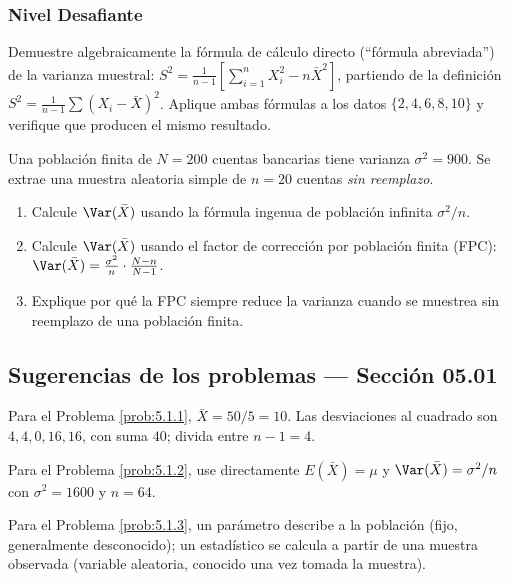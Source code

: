 \subsubsection*{Nivel Desafiante}

\begin{problema}
	\label{prob:5.1.9}
	Demuestre algebraicamente la fórmula de cálculo directo (``fórmula abreviada'') de la varianza muestral: $S^{2} = \frac{1}{n-1}\left[\sum_{i=1}^n X_i^{2} - n\bar{X}^{2}\right]$, partiendo de la definición $S^{2} = \frac{1}{n-1}\sum(X_i-\bar{X})^{2}$. Aplique ambas fórmulas a los datos $\{2, 4, 6, 8, 10\}$ y verifique que producen el mismo resultado.
\end{problema}

\begin{problema}
	\label{prob:5.1.10}
	Una población finita de $N = 200$ cuentas bancarias tiene varianza $\sigma^{2} = 900$. Se extrae una muestra aleatoria simple de $n = 20$ cuentas \emph{sin reemplazo}.
	\begin{enumerate}
		\item Calcule $\Var(\bar{X})$ usando la fórmula ingenua de población infinita $\sigma^{2}/n$.
		\item Calcule $\Var(\bar{X})$ usando el factor de corrección por población finita (FPC): $\Var(\bar{X}) = \frac{\sigma^{2}}{n}\cdot\frac{N-n}{N-1}$.
		\item Explique por qué la FPC siempre reduce la varianza cuando se muestrea sin reemplazo de una población finita.
	\end{enumerate}
\end{problema}

\subsection*{Sugerencias de los problemas --- Sección 05.01}

\begin{sugerencia}
	\label{sug:5.1.1}
	Para el Problema \ref{prob:5.1.1}, $\bar{X} = 50/5 = 10$. Las desviaciones al cuadrado son $4, 4, 0, 16, 16$, con suma $40$; divida entre $n-1=4$.
\end{sugerencia}

\begin{sugerencia}
	\label{sug:5.1.2}
	Para el Problema \ref{prob:5.1.2}, use directamente $E(\bar{X})=\mu$ y $\Var(\bar{X})=\sigma^{2}/n$ con $\sigma^{2}=1600$ y $n=64$.
\end{sugerencia}

\begin{sugerencia}
	\label{sug:5.1.3}
	Para el Problema \ref{prob:5.1.3}, un parámetro describe a la población (fijo, generalmente desconocido); un estadístico se calcula a partir de una muestra observada (variable aleatoria, conocido una vez tomada la muestra).
\end{sugerencia}

